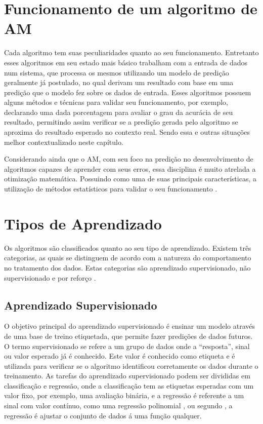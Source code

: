 \section{Funcionamento de um algoritmo de AM}
Cada algoritmo tem suas peculiaridades quanto ao seu funcionamento. Entretanto esses algoritmos em seu estado mais básico trabalham com a entrada de dados num sistema, que processa os mesmos utilizando um modelo de predição geralmente já postulado, no qual derivam um resultado com base em uma predição que o modelo fez sobre os dados de entrada. Esses algoritmos possuem alguns métodos e técnicas para validar seu funcionamento, por exemplo, declarando uma dada porcentagem para avaliar o grau da acurácia de seu resultado, permitindo assim verificar se a predição gerada pelo algoritmo se aproxima do resultado esperado no contexto real. Sendo essa e outras situações melhor contextualizado neste capítulo.

Considerando ainda que o AM, com seu foco na predição no desenvolvimento de algoritmos capazes de aprender com seus erros, essa disciplina é muito atrelada a otimização matemática. Possuindo como uma de suas principais características, a utilização de métodos estatísticos para validar o seu funcionamento \cite{trevor2009elements}.

\section{Tipos de Aprendizado}
Os algoritmos são classificados quanto ao seu tipo de aprendizado. Existem três categorias, as quais se distinguem de acordo com a natureza do comportamento no tratamento dos dados. Estas categorias são aprendizado supervisionado, não supervisionado e por reforço \cite{geron2017hands}.
 
\subsection{Aprendizado Supervisionado}
O objetivo principal do aprendizado supervisionado é ensinar um modelo através de uma base de treino etiquetada, que permite fazer predições de dados futuros. O termo supervisionado se refere a um grupo de dados onde a “resposta”, sinal ou valor esperado já é conhecido. Este valor é conhecido como etiqueta e é utilizada para verificar se o algoritmo identificou corretamente os dados durante o treinamento. As tarefas do aprendizado supervisionado podem ser divididas em classificação e regressão, onde a classificação tem as etiquetas esperadas com um valor fixo, por exemplo, uma avaliação binária, e a regressão é referente a um sinal com valor contínuo, como uma regressão polinomial \cite{geron2017hands}, ou segundo \cite{kirk2014thoughtful}, a regressão é ajustar o conjunto de dados á uma função qualquer.

